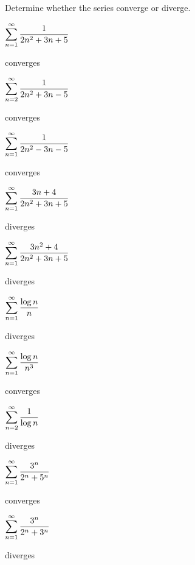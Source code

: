 \begin{exercises}

Determine whether the series converge or diverge.

\twocol

\begin{exercise} $\displaystyle\sum_{n=1}^\infty {1\over 2n^2+3n+5} $
\begin{answer} converges
\end{answer}\end{exercise}

\begin{exercise} $\displaystyle\sum_{n=2}^\infty {1\over 2n^2+3n-5} $
\begin{answer}  converges
\end{answer}\end{exercise}

\begin{exercise} $\displaystyle\sum_{n=1}^\infty {1\over 2n^2-3n-5} $
\begin{answer}  converges
\end{answer}\end{exercise}

\begin{exercise} $\displaystyle\sum_{n=1}^\infty {3n+4\over 2n^2+3n+5} $
\begin{answer} diverges
\end{answer}\end{exercise}

\begin{exercise} $\displaystyle\sum_{n=1}^\infty {3n^2+4\over 2n^2+3n+5} $
\begin{answer} diverges
\end{answer}\end{exercise}

\begin{exercise} $\displaystyle\sum_{n=1}^\infty {\log n\over n}$
\begin{answer} diverges
\end{answer}\end{exercise}

\begin{exercise} $\displaystyle\sum_{n=1}^\infty {\log n\over n^3}$
\begin{answer} converges
\end{answer}\end{exercise}

\begin{exercise} $\displaystyle\sum_{n=2}^\infty {1\over \log n}$
\begin{answer} diverges
\end{answer}\end{exercise}

\begin{exercise} $\displaystyle\sum_{n=1}^\infty {3^n\over 2^n+5^n}$
\begin{answer} converges
\end{answer}\end{exercise}

\begin{exercise} $\displaystyle\sum_{n=1}^\infty {3^n\over 2^n+3^n}$
\begin{answer} diverges
\end{answer}\end{exercise}

\endtwocol

\end{exercises}

